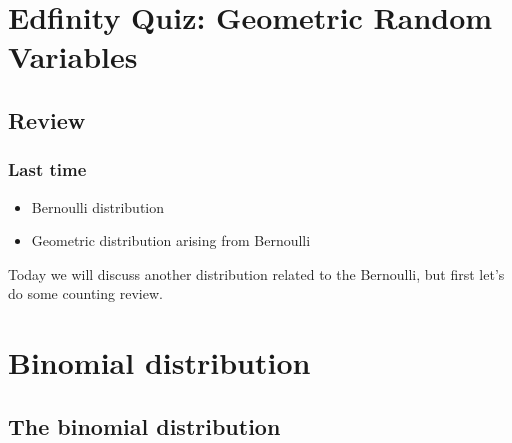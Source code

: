 \documentclass[slidestop,compress,mathserif]{beamer}
\begin{document}

\section{Edfinity Quiz: Geometric Random Variables}


\subsection{Review}

\begin{frame}
\frametitle{Last time}

\begin{itemize}
    \item Bernoulli distribution
    \item Geometric distribution arising from Bernoulli
\end{itemize}

Today we will discuss another distribution related to the Bernoulli, but first let's do some counting review.
\end{frame}


\section{Binomial distribution}


\subsection{The binomial distribution}

\end{document}
